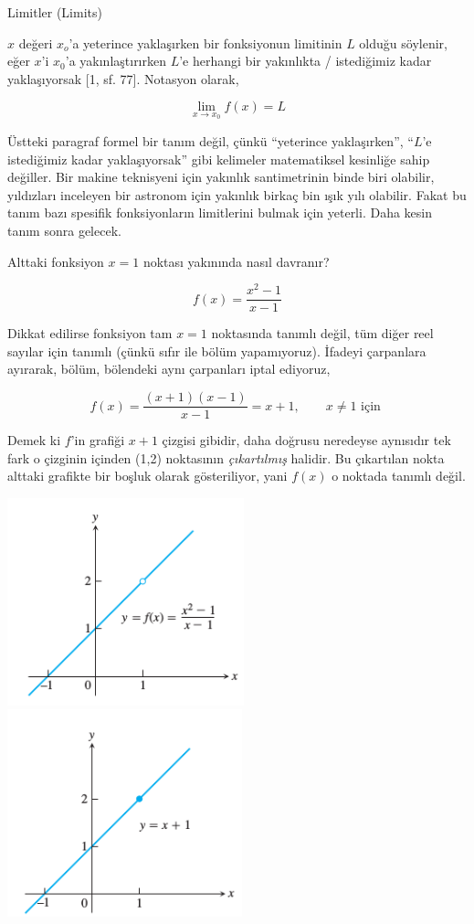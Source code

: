 \documentclass[12pt,fleqn]{article}\usepackage{../../common}
\begin{document}
Limitler (Limits)

$x$ değeri $x_o$'a yeterince yaklaşırken bir fonksiyonun limitinin $L$
olduğu söylenir, eğer $x$'i $x_0$'a yakınlaştırırken $L$'e herhangi bir
yakınlıkta / istediğimiz kadar yaklaşıyorsak [1, sf. 77]. Notasyon olarak,

$$ \lim_{x \to x_0} f(x) = L  $$

Üstteki paragraf formel bir tanım değil, çünkü ``yeterince yaklaşırken'',
``$L$'e istediğimiz kadar yaklaşıyorsak'' gibi kelimeler matematiksel
kesinliğe sahip değiller. Bir makine teknisyeni için yakınlık santimetrinin
binde biri olabilir, yıldızları inceleyen bir astronom için yakınlık birkaç
bin ışık yılı olabilir. Fakat bu tanım bazı spesifik fonksiyonların
limitlerini bulmak için yeterli. Daha kesin tanım sonra gelecek.

Alttaki fonksiyon $x=1$ noktası yakınında nasıl davranır? 

$$ f(x) = \frac{x^2 - 1}{x-1} $$

Dikkat edilirse fonksiyon tam $x=1$ noktasında tanımlı değil, tüm diğer
reel sayılar için tanımlı (çünkü sıfır ile bölüm yapamıyoruz). İfadeyi
çarpanlara ayırarak, bölüm, bölendeki aynı çarpanları iptal ediyoruz,

$$ f(x) = \frac{(x + 1)(x-1)}{x-1} = x+1, \qquad x \ne 1 \textrm{ için }$$

Demek ki $f$'in grafiği $x+1$ çizgisi gibidir, daha doğrusu neredeyse
aynısıdır tek fark o çizginin içinden (1,2) noktasının {\em çıkartılmış}
halidir. Bu çıkartılan nokta alttaki grafikte bir boşluk olarak
gösteriliyor, yani $f(x)$ o noktada tanımlı değil.

\includegraphics[height=6cm]{limits_01.png}
\includegraphics[height=6cm]{limits_02.png}
\end{document}
